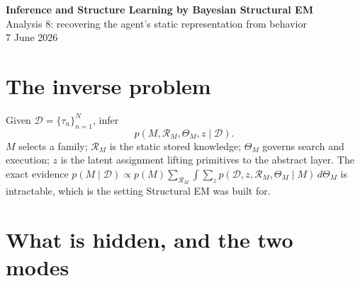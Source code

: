 \documentclass[10pt]{article}
\begin{document}
\begin{center}
{\LARGE\bfseries Inference and Structure Learning by Bayesian Structural EM}\\[2pt]
{\large Analysis 8: recovering the agent's static representation from behavior}\\[3pt]
{\small 7 June 2026}
\end{center}

\begin{abstract}
Analysis 7 fixed the \emph{generative} model: a static, task-independent representation
$\mathcal R_M$ induces a cognitive map, a search kernel selects latent assignments $z$, and an
execution model emits behavior. This note treats the \emph{inverse} problem: given
trajectories, recover the family $M$, the representation $\mathcal R_M$, the continuous
parameters $\Theta_M$, and whatever latent assignment remains. The umbrella algorithm is
Friedman's \emph{Bayesian Structural EM}. Its two families read differently inside this
umbrella: the action-chunk family is \emph{grammar induction with a per-occurrence parse}
$z^{g}$, whereas the landmark family is \emph{graph clustering} --- learning the static
membership $z^{\ell}:\mathcal S\to\mathcal L$ and the region graph $\mathcal E^{\mathcal L}$,
a hidden mediating layer over observed states in the sense of Friedman's hidden-variable
networks (his Fig.~1b).
\end{abstract}

\section{The inverse problem}

Given $\mathcal D=\{\tau_n\}_{n=1}^N$, infer
\begin{equation}
p(M,\mathcal R_M,\Theta_M,z\mid\mathcal D).
\label{eq:inverse}
\end{equation}
$M$ selects a family; $\mathcal R_M$ is the static stored knowledge; $\Theta_M$ governs
search and execution; $z$ is the latent assignment lifting primitives to the abstract layer.
The exact evidence $p(M\mid\mathcal D)\propto p(M)\sum_{\mathcal R_M}\int\sum_z
p(\mathcal D,z,\mathcal R_M,\Theta_M\mid M)\,d\Theta_M$ is intractable, which is the setting
Structural EM was built for.

\section{What is hidden, and the two modes}
\end{document}
